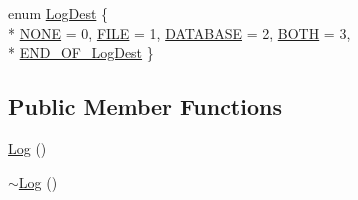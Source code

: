 \begin{DoxyCompactItemize}
enum \hyperlink{classutils_1_1Log_aa77064096777fe92d4ff8f6d68d42d5a}{Log\+Dest} \{ \\*
\hyperlink{classutils_1_1Log_aa77064096777fe92d4ff8f6d68d42d5aa073188971cc5f6222bcd080faba0e170}{N\+O\+NE} = 0, 
\hyperlink{classutils_1_1Log_aa77064096777fe92d4ff8f6d68d42d5aaa4c1e78fb35ae098bba52e43e2a5e0e5}{F\+I\+LE} = 1, 
\hyperlink{classutils_1_1Log_aa77064096777fe92d4ff8f6d68d42d5aa9b86815165af42d845410f10dfd2e061}{D\+A\+T\+A\+B\+A\+SE} = 2, 
\hyperlink{classutils_1_1Log_aa77064096777fe92d4ff8f6d68d42d5aa777a40d3f6fbce3f8d928c9d791e6d03}{B\+O\+TH} = 3, 
\\*
\hyperlink{classutils_1_1Log_aa77064096777fe92d4ff8f6d68d42d5aacabf499629d9834d891a51d030cdef68}{E\+N\+D\+\_\+\+O\+F\+\_\+\+Log\+Dest}
 \}
\end{DoxyCompactItemize}
\subsection*{Public Member Functions}
\begin{DoxyCompactItemize}
\item 
\hyperlink{classutils_1_1Log_a889fde15d21820f27d32315d53e75a06}{Log} ()
\item 
\hyperlink{classutils_1_1Log_aca4c4527042fc72294f36013924bb309}{$\sim$\+Log} ()
\end{DoxyCompactItemize}
